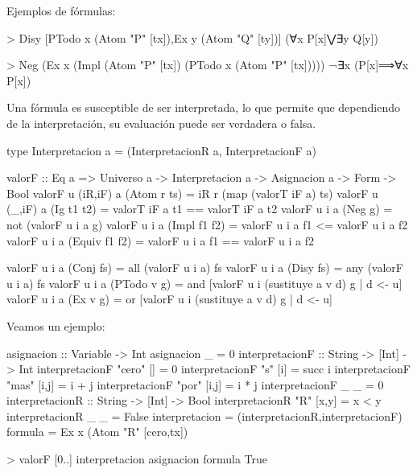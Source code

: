 \documentclass[aspectratio=169]{beamer}
\begin{document}
\begin{frame}[fragile]
  Ejemplos de fórmulas:

  \vspace{5mm}
\begin{sesion}
> Disy [PTodo x (Atom "P" [tx]),Ex y (Atom "Q" [ty])]
(∀x P[x]⋁∃y Q[y])


> Neg (Ex x (Impl (Atom "P" [tx]) (PTodo x (Atom "P" [tx]))))
¬∃x (P[x]⟹∀x P[x])
\end{sesion}
\end{frame}

\begin{frame}
 Una fórmula es susceptible de ser interpretada, lo que permite que dependiendo de la interpretación, su evaluación puede ser verdadera o falsa. 
\end{frame}

\begin{frame}[fragile]
\begin{code}
type Interpretacion a =
      (InterpretacionR a, InterpretacionF a)  
\end{code}

\begin{code}
valorF :: Eq a => Universo a -> Interpretacion a
             -> Asignacion a -> Form -> Bool
valorF u (iR,iF) a (Atom r ts) =   
    iR r (map (valorT iF a) ts)
valorF u (_,iF) a (Ig t1 t2)   =   
    valorT iF a t1 == valorT iF a t2
valorF u i a (Neg g)           =  
    not (valorF u i a g)
valorF u i a (Impl f1 f2)      =  
    valorF u i a f1 <= valorF u i a f2
valorF u i a (Equiv f1 f2)     =  
    valorF u i a f1 == valorF u i a f2
\end{code}  
\end{frame}


\begin{frame}[fragile]
\begin{code}
valorF u i a (Conj fs)   =
    all (valorF u i a) fs
valorF u i a (Disy fs)   =  
    any (valorF u i a) fs
valorF u i a (PTodo v g) = 
    and [valorF u i (sustituye a v d) g | d <- u]
valorF u i a (Ex v g)    = 
    or  [valorF u i (sustituye a v d) g | d <- u]    
\end{code}
\end{frame}

\begin{frame}
Veamos un ejemplo:
\begin{code}  
asignacion :: Variable -> Int
asignacion _ = 0
interpretacionF :: String -> [Int] -> Int
interpretacionF "cero" []    = 0
interpretacionF "s"    [i]   = succ i
interpretacionF "mas"  [i,j] = i + j
interpretacionF "por"  [i,j] = i * j
interpretacionF _ _          = 0
interpretacionR :: String -> [Int] -> Bool
interpretacionR "R" [x,y] = x < y  
interpretacionR _ _       = False
interpretacion = (interpretacionR,interpretacionF)
formula = Ex x (Atom "R" [cero,tx])
\end{code}
\begin{sesion}
  
> valorF [0..] interpretacion asignacion formula
True
\end{sesion}
\end{frame}
\end{document}
